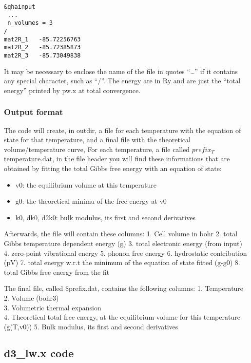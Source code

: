 \documentclass[
]{article}
\providecommand{\tightlist}{%
  \setlength{\itemsep}{0pt}\setlength{\parskip}{0pt}}
\begin{document}
\begin{verbatim}
&qhainput
 ...
 n_volumes = 3
/
mat2R_1   -85.72256763
mat2R_2   -85.72385873
mat2R_3   -85.73049838
\end{verbatim}

It may be necessary to enclose the name of the file in quotes
\enquote{\ldots{}} if it contains any special character, such as
\enquote{/}. The energy are in Ry and are just the \enquote{total
energy} printed by pw.x at total convergence.

\hypertarget{output-format-1}{%
\subsubsection{Output format}\label{output-format-1}}

The code will create, in outdir, a file for each temperature with the
equation of state for that temperature, and a final file with the
theoretical volume/temperature curve, For each temperature, a file
called \(prefix_T\)temperature.dat, in the file header you will find
these informations that are obtained by fitting the total Gibbs free
energy with an equation of state:

\begin{itemize}
\tightlist
\item
  v0: the equilibrium volume at this temperature
\item
  g0: the theoretical minimu of the free energy at v0
\item
  k0, dk0, d2k0: bulk modulus, its first and second derivatives
\end{itemize}

Afterwards, the file will contain these columns: 1. Cell volume in bohr
2. total Gibbs temperature dependent energy (g) 3. total electronic
energy (from input) 4. zero-point vibrational energy 5. phonon free
energy 6. hydrostatic contribution (pV) 7. total energy w.r.t the
minimum of the equation of state fitted (g-g0) 8. total Gibbs free
energy from the fit

The final file, called \$prefix.dat, contains the following columns: 1.
Temperature\\
2. Volume (bohr3)\\
3. Volumetric thermal expansion\\
4. Theoretical total free energy, at the equilibrium volume for this
temperature (g(T,v0)) 5. Bulk modulus, its first and second derivatives

\hypertarget{d3_lw.x-code}{%
\subsection{d3\_lw.x code}\label{d3_lw.x-code}}
\end{document}
